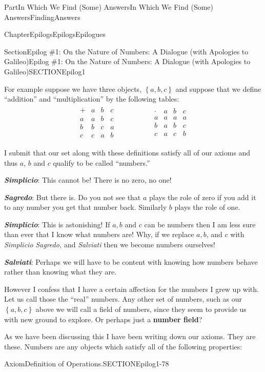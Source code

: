 \documentclass[oneside,10pt,]{book}
\newcommand{\alert}[1]{\textbf{\textit{#1}}}
\newcommand{\terminology}[1]{\textbf{#1}}
\numberwithin{equation}{part}
\newcommand{\amp}{&}
\begin{document}
\begin{partptx}{Part}{In Which We Find (Some) Answers}{}{In Which We Find (Some) Answers}{}{}{FindingAnswers}
\begin{chapterptx}{Chapter}{Epilogs}{}{Epilogs}{}{}{Epilogues}
\begin{sectionptx}{Section}{Epilog \#1: On the Nature of Numbers: A Dialogue (with Apologies to Galileo)}{}{Epilog \#1: On the Nature of Numbers: A Dialogue (with Apologies to Galileo)}{}{}{SECTIONEpilog1}
\par
For example suppose we have three objects, \(\left\{a, b, c\right\}\) and suppose that we define ``addition'' and ``multiplication'' by the following tables:%
\begin{align*}
\begin{array}{c|ccc}
+\amp a\amp b\amp c\\\hline
a\amp a\amp b\amp c\\
b\amp b\amp c\amp a\\
c\amp c\amp a\amp b
\end{array}
\amp \amp \amp \amp \amp \amp
\begin{array}{c|ccc}
\cdot\amp a\amp b\amp c\\\hline
a\amp a\amp a\amp a\\
b\amp a\amp b\amp c\\
c\amp a\amp c\amp b
\end{array}
\end{align*}
%
\par
I submit that our set along with these definitions satisfy all of our axioms and thus \(a\), \(b\) and \(c\) qualify to be called ``numbers.''%
\par
\alert{Simplicio}:  This cannot be! There is no zero, no one!%
\par
\alert{Sagredo}:  But there is. Do you not see that \(a\) plays the role of zero \textemdash{} if you add it to any number you get that number back. Similarly \(b\) plays the role of one.%
\par
\alert{Simplicio}: This is astonishing!  If \(a, b\) and \(c\) can be numbers then I am less sure than ever that I know what numbers are!  Why, if we replace \(a, b\), and \(c\) with \emph{Simplicio} \emph{Sagredo,} and \emph{Salviati} then we become numbers ourselves!%
\par
\alert{Salviati}: Perhaps we will have to be content with knowing how numbers behave rather than knowing what they are.%
\par
However I confess that I have a certain affection for the numbers I grew up with. Let us call those the ``real'' numbers. Any other set of numbers, such as our \(\left\{a,b,c\right\}\) above we will call a field of numbers, since they seem to provide us with new ground to explore. Or perhaps just a \terminology{number field}?%
\par
As we have been discussing this I have been writing down our axioms.  They are these.  Numbers are any objects which satisfy all of the following properties:%
\begin{axiom}{Axiom}{Definition of Operations.}{}{SECTIONEpilog1-78}%

\end{axiom}
\end{sectionptx}
\end{chapterptx}
\end{partptx}
\end{document}
